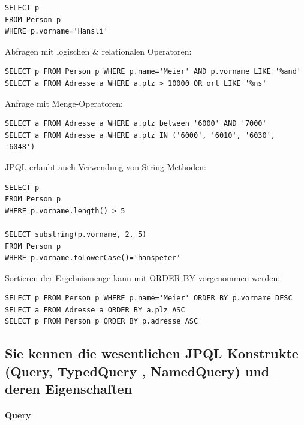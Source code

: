 \documentclass[a4paper]{article}
\begin{document}
		\begin{lstlisting}
SELECT p
FROM Person p
WHERE p.vorname='Hansli'
		\end{lstlisting}
		\noindent
		Abfragen mit logischen \& relationalen Operatoren:
		\begin{lstlisting}
SELECT p FROM Person p WHERE p.name='Meier' AND p.vorname LIKE '%and'
SELECT a FROM Adresse a WHERE a.plz > 10000 OR ort LIKE '%ns'
		\end{lstlisting}
		\noindent
		Anfrage mit Menge-Operatoren:
		\begin{lstlisting}
SELECT a FROM Adresse a WHERE a.plz between '6000' AND '7000'
SELECT a FROM Adresse a WHERE a.plz IN ('6000', '6010', '6030', '6048')
		\end{lstlisting}
		\noindent
		JPQL erlaubt auch Verwendung von String-Methoden:
		\begin{lstlisting}
SELECT p
FROM Person p
WHERE p.vorname.length() > 5

SELECT substring(p.vorname, 2, 5)
FROM Person p
WHERE p.vorname.toLowerCase()='hanspeter'
		\end{lstlisting}
		\noindent
		Sortieren der Ergebnismenge kann mit ORDER BY vorgenommen werden:
		\begin{lstlisting}
SELECT p FROM Person p WHERE p.name='Meier' ORDER BY p.vorname DESC
SELECT a FROM Adresse a ORDER BY a.plz ASC
SELECT p FROM Person p ORDER BY p.adresse ASC
		\end{lstlisting}
		
		\newpage
		
		\subsection{Sie kennen die wesentlichen JPQL Konstrukte (Query, TypedQuery , NamedQuery) und deren Eigenschaften}
		
				\paragraph{Query}
				
\end{document}
